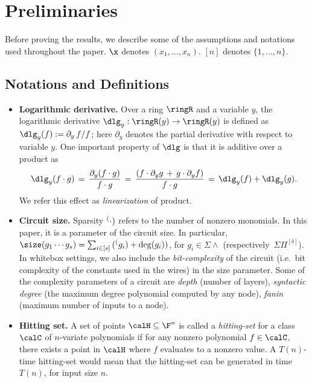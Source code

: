 \section{Preliminaries}  \label{sec:prel}
Before proving the results, we describe some of the assumptions and notations used throughout the paper. $\x$ denotes $(x_1,\hdots,x_n)$. $[n]$ denotes $\{1,\hdots,n\}$.

\subsection{Notations and Definitions}

\smallskip
\begin{itemize}
    \item \textbf{Logarithmic derivative.} Over a ring $\ringR$ and a variable $y$, the logarithmic derivative $\dlg_{y} : \ringR(y) \to \ringR(y)$ is defined as $\dlg_{y}(f):=\partial_y\,f/f$; here $\partial_{y}$ denotes the partial derivative with respect to variable $y$. One important property of $\dlg$ is that it is additive over a product as \[\dlg_{y}(f \cdot g) \,=\, \frac{\partial_y(f \cdot g)}{f \cdot g} \,=\, \frac{(f \cdot \partial_y g \,+\, g \cdot \partial_y f)}{f \cdot g}\,=\,\dlg_{y}(f) + \dlg_y(g).\] 
    \noindent We refer this effect as \emph{linearization} of product.

    \item \textbf{Circuit size.} Sparsity $\sp(\cdot)$ refers to the number of nonzero monomials. In this paper, it is a parameter of the circuit size. In particular, $\size(g_1 \cdots g_s)=\sum_{i \in [s]}\,(\sp(g_i)+\deg(g_i))$, for $g_i \in \Sigma \wedge$ (respectively~$\Sigma \Pi^{[\delta]}$). In whitebox settings, we also include the \emph{bit-complexity} of the circuit (i.e.~bit complexity of the constants used in the wires) in the size parameter. 
    Some of the complexity parameters of a circuit are \emph{depth} (number of layers), \emph{syntactic degree} (the maximum degree polynomial computed
    by any node), {\em fanin} (maximum number of inputs to a node).

    \item \textbf{Hitting set.} A set of points $\calH \subseteq \F^n$ is called a \emph{hitting-set} for a class $\calC$ of $n$-variate polynomials if for any nonzero polynomial $f \in \calC$, there exists a point in $\calH$ where $f$ evaluates to a nonzero value. A $T(n)$-time hitting-set would mean that the hitting-set can be generated in time $T(n)$, for input size $n$. 


\end{itemize}
